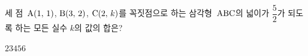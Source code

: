 세 점~$\mathrm{A}(1,\,1)$, $\mathrm{B}(3,\,2)$, $\mathrm{C}(2,\,k)$를 꼭짓점으로 하는 삼각형~$\mathrm{ABC}$의 넓이가 $\dfrac{5}{2}$가 되도록 하는 모든 실수 $k$의 값의 합은?
\begin{choices32}{$2$}{$3$}{$4$}{$5$}{$6$}\end{choices32}
